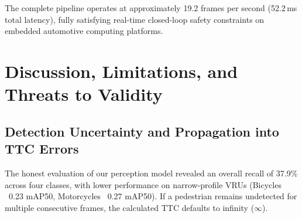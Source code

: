 \documentclass[3p,twocolumn]{elsarticle}
\begin{document}
\begin{table}[!t]
\caption{End-to-End Computational Latency Budget per 30\,fps Video Frame}
\label{tab:latency}
\centering
\small
{}%
\end{table}

The complete pipeline operates at approximately 19.2 frames per second (52.2\,ms total latency), fully satisfying real-time closed-loop safety constraints on embedded automotive computing platforms.

\section{Discussion, Limitations, and Threats to Validity}
\label{sec:limitations}

\subsection{Detection Uncertainty and Propagation into TTC Errors}
The honest evaluation of our perception model revealed an overall recall of 37.9\% across four classes, with lower performance on narrow-profile VRUs (Bicycles ~0.23 mAP50, Motorcycles ~0.27 mAP50). If a pedestrian remains undetected for multiple consecutive frames, the calculated TTC defaults to infinity ($\infty$). 
\end{document}
